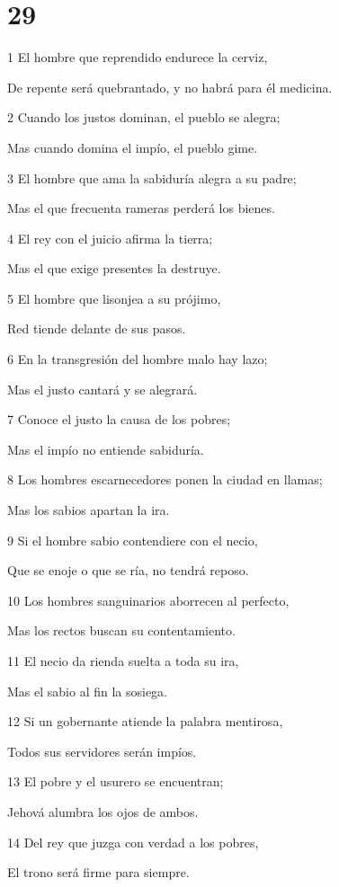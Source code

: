 \chapter{29}

\par 1 El hombre que reprendido endurece la cerviz,
\par De repente será quebrantado, y no habrá para él medicina.
\par 2 Cuando los justos dominan, el pueblo se alegra;
\par Mas cuando domina el impío, el pueblo gime.
\par 3 El hombre que ama la sabiduría alegra a su padre;
\par Mas el que frecuenta rameras perderá los bienes.
\par 4 El rey con el juicio afirma la tierra;
\par Mas el que exige presentes la destruye.
\par 5 El hombre que lisonjea a su prójimo,
\par Red tiende delante de sus pasos.
\par 6 En la transgresión del hombre malo hay lazo;
\par Mas el justo cantará y se alegrará.
\par 7 Conoce el justo la causa de los pobres;
\par Mas el impío no entiende sabiduría.
\par 8 Los hombres escarnecedores ponen la ciudad en llamas;
\par Mas los sabios apartan la ira.
\par 9 Si el hombre sabio contendiere con el necio,
\par Que se enoje o que se ría, no tendrá reposo.
\par 10 Los hombres sanguinarios aborrecen al perfecto,
\par Mas los rectos buscan su contentamiento.
\par 11 El necio da rienda suelta a toda su ira,
\par Mas el sabio al fin la sosiega.
\par 12 Si un gobernante atiende la palabra mentirosa,
\par Todos sus servidores serán impíos.
\par 13 El pobre y el usurero se encuentran;
\par Jehová alumbra los ojos de ambos.
\par 14 Del rey que juzga con verdad a los pobres,
\par El trono será firme para siempre.
